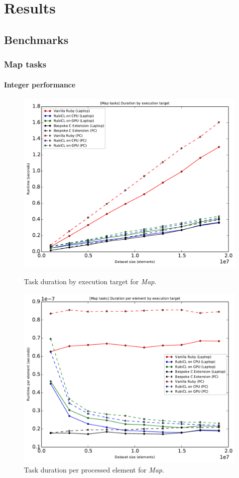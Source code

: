 \chapter{Results}

\section{Benchmarks}
\newpage
\subsection{Map tasks}
\subsubsection{Integer performance}
\begin{figure}[H]
  \centering
  \includegraphics[width=\textwidth]{./graphing/just_map/runtimes.pdf}
  \caption{Task duration by execution target for \emph{Map}.}
  \label{fig:map_task_runtime_g}

  \includegraphics[width=\textwidth]{./graphing/just_map/per_element.pdf}
  \caption{Task duration per processed element for \emph{Map}.}
  \label{fig:map_task_per_el_g}

\end{figure}
